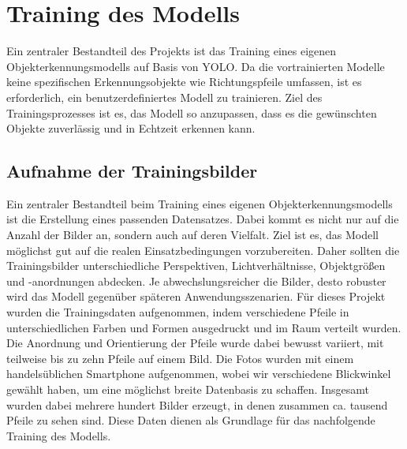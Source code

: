 \section{Training des Modells}
Ein zentraler Bestandteil des Projekts ist das Training eines eigenen Objekterkennungsmodells auf Basis von YOLO. 
Da die vortrainierten Modelle keine spezifischen Erkennungsobjekte wie Richtungspfeile umfassen, ist es erforderlich, ein benutzerdefiniertes Modell zu trainieren. 
Ziel des Trainingsprozesses ist es, das Modell so anzupassen, dass es die gewünschten Objekte zuverlässig und in Echtzeit erkennen kann.
\subsection{Aufnahme der Trainingsbilder}
Ein zentraler Bestandteil beim Training eines eigenen Objekterkennungsmodells ist die Erstellung eines passenden Datensatzes. 
Dabei kommt es nicht nur auf die Anzahl der Bilder an, sondern auch auf deren Vielfalt. 
Ziel ist es, das Modell möglichst gut auf die realen Einsatzbedingungen vorzubereiten. 
Daher sollten die Trainingsbilder unterschiedliche Perspektiven, Lichtverhältnisse, Objektgrößen und -anordnungen abdecken. 
Je abwechslungsreicher die Bilder, desto robuster wird das Modell gegenüber späteren Anwendungsszenarien.
\cite{yolo_data_docu}
\newPar
Für dieses Projekt wurden die Trainingsdaten aufgenommen, indem verschiedene Pfeile in unterschiedlichen Farben und Formen ausgedruckt und im Raum verteilt wurden. 
Die Anordnung und Orientierung der Pfeile wurde dabei bewusst variiert, mit teilweise bis zu zehn Pfeile auf einem Bild.
Die Fotos wurden mit einem handelsüblichen Smartphone aufgenommen, wobei wir verschiedene Blickwinkel gewählt haben, um eine möglichst breite Datenbasis zu schaffen. 
Insgesamt wurden dabei mehrere hundert Bilder erzeugt, in denen zusammen ca. tausend Pfeile zu sehen sind.
Diese Daten dienen als Grundlage für das nachfolgende Training des Modells.
